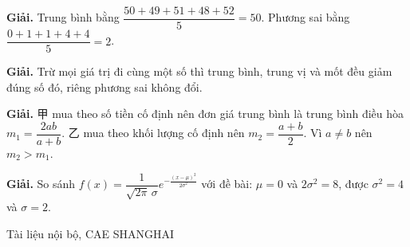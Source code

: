 \documentclass[11pt, a4paper]{article}
\begin{document}
\vspace{0.3cm}
\begin{dapan}[45 — Đáp án B]

\textbf{Giải.} Trung bình bằng $\dfrac{50+49+51+48+52}{5}=50$. Phương sai bằng $\dfrac{0+1+1+4+4}{5}=2$.


\end{dapan}
\vspace{0.3cm}
\begin{dapan}[46 — Đáp án B]

\textbf{Giải.} Trừ mọi giá trị đi cùng một số thì trung bình, trung vị và mốt đều giảm đúng số đó, riêng phương sai không đổi.


\end{dapan}
\vspace{0.3cm}
\begin{dapan}[47 — Đáp án C]

\textbf{Giải.} 甲 mua theo số tiền cố định nên đơn giá trung bình là trung bình điều hòa $m_1=\dfrac{2ab}{a+b}$. 乙 mua theo khối lượng cố định nên $m_2=\dfrac{a+b}{2}$. Vì $a \ne b$ nên $m_2>m_1$.


\end{dapan}
\vspace{0.3cm}
\begin{dapan}[48 — Đáp án D]

\textbf{Giải.} So sánh $f(x)=\dfrac{1}{\sqrt{2\pi}\,\sigma} e^{-\frac{(x-\mu)^2}{2\sigma^2}}$ với đề bài: $\mu=0$ và $2\sigma^2=8$, được $\sigma^2=4$ và $\sigma=2$.
\end{dapan}
\vspace{0.3cm}

\vspace{0.8cm}
\begin{center}
{\footnotesize\color{cae_blue} Tài liệu nội bộ, CAE SHANGHAI}
\end{center}
\end{document}
